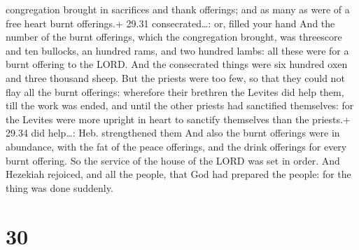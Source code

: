 congregation brought in sacrifices and thank offerings; and as many as
were of a free heart burnt offerings.+ 29.31 consecrated\ldots: or,
filled your hand  And the number of the burnt offerings,
which the congregation brought, was threescore and ten bullocks, an
hundred rams, and two hundred lambs: all these were for a burnt offering
to the LORD.  And the consecrated things were six hundred
oxen and three thousand sheep.  But the priests were too
few, so that they could not flay all the burnt offerings: wherefore
their brethren the Levites did help them, till the work was ended, and
until the other priests had sanctified themselves: for the Levites were
more upright in heart to sanctify themselves than the priests.+ 29.34
did help\ldots: Heb. strengthened them  And also the burnt
offerings were in abundance, with the fat of the peace offerings, and
the drink offerings for every burnt offering. So the service of the
house of the LORD was set in order.  And Hezekiah rejoiced,
and all the people, that God had prepared the people: for the thing was
done suddenly.

\hypertarget{section-29}{%
\section{30}\label{section-29}}

